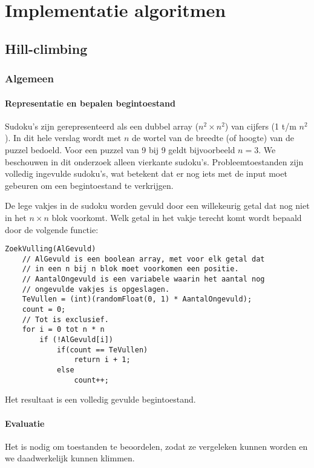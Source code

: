 \documentclass[]{report}
\begin{document}
\chapter{Implementatie algoritmen}
\section{Hill-climbing}
\subsection{Algemeen}
\subsubsection{Representatie en bepalen begintoestand}
Sudoku's zijn gerepresenteerd als een dubbel array ($n^2 \times n^2$)  van cijfers (1 t/m $n^2$). In dit hele verslag wordt met $n$ de wortel van de breedte (of hoogte) van de puzzel bedoeld. Voor een puzzel van 9 bij 9 geldt bijvoorbeeld $n = 3$. We beschouwen in dit onderzoek alleen vierkante sudoku's. Probleemtoestanden zijn volledig ingevulde sudoku's, wat betekent dat er nog iets met de input moet gebeuren om een begintoestand te verkrijgen.

De lege vakjes in de sudoku worden gevuld door een willekeurig getal dat nog niet in het $n \times n$ blok voorkomt. Welk getal in het vakje terecht komt wordt bepaald door de volgende functie:

\begin{minipage}{\textwidth}
\begin{lstlisting}
ZoekVulling(AlGevuld)
	// AlGevuld is een boolean array, met voor elk getal dat
	// in een n bij n blok moet voorkomen een positie.
	// AantalOngevuld is een variabele waarin het aantal nog
	// ongevulde vakjes is opgeslagen.
	TeVullen = (int)(randomFloat(0, 1) * AantalOngevuld);
	count = 0;
	// Tot is exclusief.
	for i = 0 tot n * n
		if (!AlGevuld[i])
			if(count == TeVullen)
				return i + 1;
			else 
				count++;
\end{lstlisting}
\end{minipage}

Het resultaat is een volledig gevulde begintoestand.

\subsubsection{Evaluatie}
Het is nodig om toestanden te beoordelen, zodat ze vergeleken kunnen worden en we daadwerkelijk kunnen klimmen.
\end{document}
